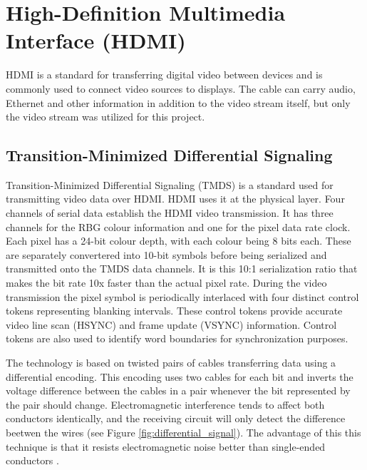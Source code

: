 \section{High-Definition Multimedia Interface (HDMI)}
HDMI is a standard for transferring digital video between devices and is commonly used to connect video sources to displays.
The cable can carry audio, Ethernet and other information in addition to the video stream itself, but only the video stream was utilized for this project.

\subsection{Transition-Minimized Differential Signaling}
Transition-Minimized Differential Signaling (TMDS) is a standard used for transmitting video data over HDMI.
HDMI uses it at the physical layer.
Four channels of serial data establish the HDMI video transmission.
It has three channels for the RBG colour information and one for the pixel data rate clock.
Each pixel has a 24-bit colour depth, with each colour being 8 bits each.
These are separately convertered into 10-bit symbols before being serialized and transmitted onto the TMDS data channels.
It is this 10:1 serialization ratio that makes the bit rate 10x faster than the actual pixel rate.
During the video transmission the pixel symbol is periodically interlaced with four distinct control tokens representing blanking intervals.
These control tokens provide accurate video line scan (HSYNC) and frame update (VSYNC) information.
Control tokens are also used to identify word boundaries for synchronization purposes.

The technology is based on twisted pairs of cables transferring data using a differential encoding.
This encoding uses two cables for each bit and inverts the voltage difference between the cables in a pair whenever the bit represented by the pair should change.
Electromagnetic interference tends to affect both conductors identically, and the receiving circuit will only detect the difference beetwen the wires (see Figure \ref{fig:differential_signal}). The advantage of this this technique is that it resists electromagnetic noise better than single-ended conductors \cite{diffsig}.


